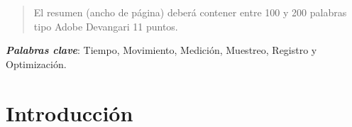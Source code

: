     
    
    
    \maketitle
    \thispagestyle{fancy}
    
    
    
    \begin{abstract}
    \noindent 
    El resumen (ancho de página) deberá contener entre 100 y 200 palabras tipo Adobe Devangari 11 puntos.
    
    \end{abstract}
    \textbf{\textit{Palabras clave}}: {Tiempo, Movimiento, Medición, Muestreo, Registro y Optimización.}
    
    \section{Introducción}
    
